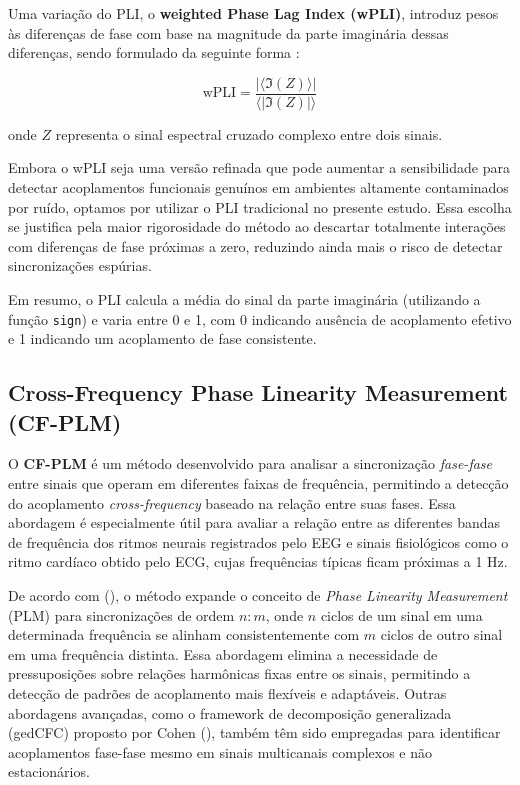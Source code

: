 Uma variação do PLI, o \textbf{weighted Phase Lag Index (wPLI)}, introduz pesos às diferenças de fase com base na magnitude da parte imaginária dessas diferenças, sendo formulado da seguinte forma \cite{seraj2018cerebral}:

\[
\text{wPLI} = \frac{|\langle \Im(Z) \rangle|}{\langle |\Im(Z)| \rangle}
\]

onde \(Z\) representa o sinal espectral cruzado complexo entre dois sinais.

Embora o wPLI seja uma versão refinada que pode aumentar a sensibilidade para detectar acoplamentos funcionais genuínos em ambientes altamente contaminados por ruído, optamos por utilizar o PLI tradicional no presente estudo. Essa escolha se justifica pela maior rigorosidade do método ao descartar totalmente interações com diferenças de fase próximas a zero, reduzindo ainda mais o risco de detectar sincronizações espúrias.

Em resumo, o PLI calcula a média do sinal da parte imaginária (utilizando a função \texttt{sign}) e varia entre 0 e 1, com 0 indicando ausência de acoplamento efetivo e 1 indicando um acoplamento de fase consistente.

\subsection{Cross-Frequency Phase Linearity Measurement (CF-PLM)}

O \textbf{CF-PLM} é um método desenvolvido para analisar a sincronização \textit{fase-fase} entre sinais que operam em diferentes faixas de frequência, permitindo a detecção do acoplamento \textit{cross-frequency} baseado na relação entre suas fases. Essa abordagem é especialmente útil para avaliar a relação entre as diferentes bandas de frequência dos ritmos neurais registrados pelo EEG e sinais fisiológicos como o ritmo cardíaco obtido pelo ECG, cujas frequências típicas ficam próximas a 1 Hz.

De acordo com \citeauthor{sorrentino2022detection} (\citeyear{sorrentino2022detection}), o método expande o conceito de \textit{Phase Linearity Measurement} (PLM) para sincronizações de ordem \(n:m\), onde \(n\) ciclos de um sinal em uma determinada frequência se alinham consistentemente com \(m\) ciclos de outro sinal em uma frequência distinta. Essa abordagem elimina a necessidade de pressuposições sobre relações harmônicas fixas entre os sinais, permitindo a detecção de padrões de acoplamento mais flexíveis e adaptáveis. Outras abordagens avançadas, como o framework de decomposição generalizada (gedCFC) proposto por Cohen (\citeyear{cohen2017multivariate}), também têm sido empregadas para identificar acoplamentos fase-fase mesmo em sinais multicanais complexos e não estacionários.

